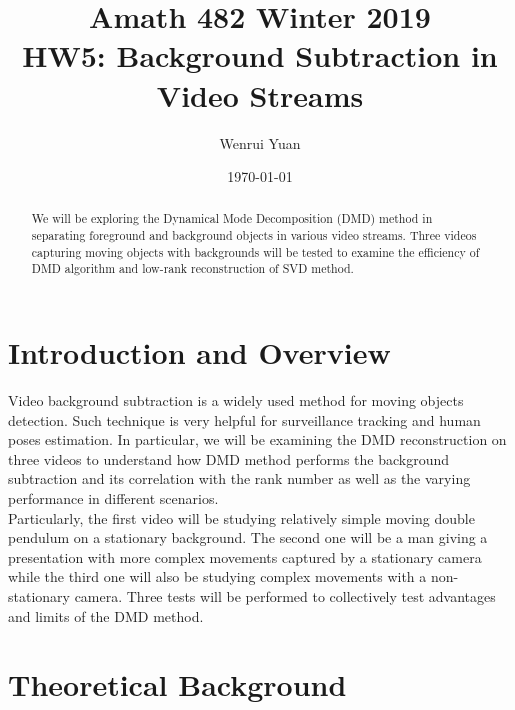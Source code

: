 \documentclass[11pt,a4paper]{article}
\title{Amath 482 Winter 2019 \\
HW5: Background Subtraction in Video Streams}
\author{Wenrui Yuan}
\date{\today}
\numberwithin{equation}{subsection}
\begin{document}
\maketitle

\begin{abstract}
	We will be exploring the Dynamical Mode Decomposition (DMD) method in separating foreground and background objects in various video streams. Three videos capturing moving objects with backgrounds will be tested to examine the efficiency of DMD algorithm and low-rank reconstruction of SVD method.
\end{abstract}

\section{Introduction and Overview}
Video background subtraction is a widely used method for moving objects detection. Such technique is very helpful for surveillance tracking and human poses estimation.\cite{fore} In particular, we will be examining the DMD reconstruction on three videos to understand how DMD method performs the background subtraction and its correlation with the rank number as well as the varying performance in different scenarios.\\
Particularly, the first video will be studying relatively simple moving double pendulum on a stationary background. The second one will be a man giving a presentation with more complex movements captured by a stationary camera while the third one will also be studying complex movements with a non-stationary camera. Three tests will be performed to collectively test advantages and limits of the DMD method.
\section{Theoretical Background}
\end{document}
